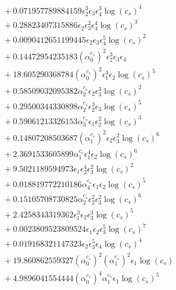 \documentclass[10pt]{article}
\begin{document}
\begin{align*}
&{}  + 0.071957789884159 \epsilon_{2}^{3} \epsilon_{3} \epsilon_{4}^{3} \log{\left(c_{s} \right)}^{4} \\
&{}  + 0.28823407315886 \epsilon_{2} \epsilon_{3}^{2} \epsilon_{4}^{4} \log{\left(c_{s} \right)}^{3} \\
&{}  + 0.0090412651199445 \epsilon_{2} \epsilon_{3} \epsilon_{4}^{5} \log{\left(c_{s} \right)}^{2} \\
&{}  + 0.14472954235183 \left(\alpha_{0}^{c_s}\right)^{2} \epsilon_{2}^{3} \epsilon_{3} \epsilon_{4} \\
&{}  + 18.605290368784 \left(\alpha_{0}^{c_s}\right)^{2} \epsilon_{1}^{4} \epsilon_{2} \log{\left(c_{s} \right)}^{5} \\
&{}  + 0.58509032095382 \alpha_{2}^{c_s} \epsilon_{2} \epsilon_{3}^{3} \log{\left(c_{s} \right)}^{2} \\
&{}  + 0.29500344330898 \alpha_{2}^{c_s} \epsilon_{2}^{3} \epsilon_{3} \log{\left(c_{s} \right)}^{5} \\
&{}  + 0.59061213326153 \alpha_{3}^{c_s} \epsilon_{1} \epsilon_{2}^{2} \log{\left(c_{s} \right)}^{3} \\
&{}  + 0.14807208503687 \left(\alpha_{1}^{c_s}\right)^{2} \epsilon_{2} \epsilon_{3}^{2} \log{\left(c_{s} \right)}^{6} \\
&{}  + 2.3691533605899 \alpha_{1}^{c_s} \epsilon_{1}^{4} \epsilon_{2} \log{\left(c_{s} \right)}^{6} \\
&{}  + 9.5021189594973 \epsilon_{1} \epsilon_{2}^{4} \epsilon_{3}^{2} \log{\left(c_{s} \right)}^{2} \\
&{}  + 0.018819772210186 \alpha_{4}^{c_s} \epsilon_{1} \epsilon_{2} \log{\left(c_{s} \right)}^{5} \\
&{}  + 0.15105708730825 \alpha_{2}^{c_s} \epsilon_{2}^{2} \epsilon_{3}^{2} \log{\left(c_{s} \right)}^{6} \\
&{}  + 2.4258343319362 \epsilon_{1}^{3} \epsilon_{2} \epsilon_{3}^{3} \log{\left(c_{s} \right)}^{5} \\
&{}  + 0.0023809523809524 \epsilon_{1} \epsilon_{2} \epsilon_{3}^{5} \log{\left(c_{s} \right)}^{7} \\
&{}  + 0.019168321147323 \epsilon_{2} \epsilon_{3}^{5} \epsilon_{4} \log{\left(c_{s} \right)}^{4} \\
&{}  + 19.860862559327 \left(\alpha_{0}^{c_s}\right)^{2} \left(\alpha_{1}^{c_s}\right)^{2} \epsilon_{1} \log{\left(c_{s} \right)} \\
&{}  + 4.9896041554444 \left(\alpha_{0}^{c_s}\right)^{4} \alpha_{1}^{c_s} \epsilon_{1} \log{\left(c_{s} \right)}^{5} \\

\end{align*}
\end{document}
